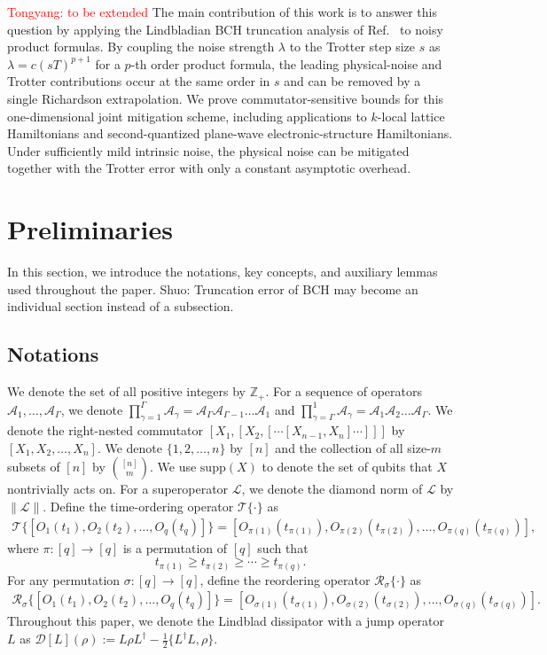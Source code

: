 \documentclass[aps,pra,reprint,groupedaddress,floatfix]{revtex4-2}
\newcommand{\A}{\mathcal{A}}
\newcommand{\supp}{\mathrm{supp}}
\newcommand{\mc}{\mathcal}
\newcommand{\mb}{\mathbb}
\newcommand{\sz}[1]{{\color{blue} Shuo: #1}}
\begin{document}
\textcolor{red}{Tongyang: to be extended}
The main contribution of this work is to answer this question by applying the Lindbladian BCH truncation analysis of Ref.~\cite{wang2026lindbladiansimulationcommutatorbounds} to noisy product formulas. By coupling the noise strength $\lambda$ to the Trotter step size $s$ as $\lambda = c(sT)^{p+1}$ for a $p$-th order product formula, the leading physical-noise and Trotter contributions occur at the same order in $s$ and can be removed by a single Richardson extrapolation. We prove commutator-sensitive bounds for this one-dimensional joint mitigation scheme, including applications to $k$-local lattice Hamiltonians and second-quantized plane-wave electronic-structure Hamiltonians. Under sufficiently mild intrinsic noise, the physical noise can be mitigated together with the Trotter error with only a constant asymptotic overhead.


\section{Preliminaries}
 In this section, we introduce the notations, key concepts, and auxiliary lemmas used throughout the paper. \sz{Truncation error of BCH may become an individual section instead of a subsection.}


\subsection{Notations}
We denote the set of all positive integers by $\mb{Z}_+$. For a sequence of operators $\A_1, \ldots, \A_{\Gamma}$, we denote $\prod_{\gamma=1}^\Gamma \A_{\gamma}= \A_{\Gamma}\A_{\Gamma-1} \ldots \A_1$ and $\prod_{\gamma=\Gamma}^1 \A_{\gamma}= \A_{1}\A_{2} \ldots \A_\Gamma$. We denote the right-nested commutator $[X_1, [X_2, [\cdots[X_{n-1}, X_n]\cdots]]]$ by $[X_1, X_2, \ldots, X_n]$. We denote $\{1, 2, \ldots, n\}$ by $[n]$ and the collection of all size-$m$ subsets of $[n]$ by $\binom{[n]}{m}$. We use $\supp(X)$ to denote the set of qubits that $X$ nontrivially acts on.  For a superoperator $\mc L$, we denote the diamond norm of $\mc L$ by $\|\mc L\|$.
Define the time-ordering operator $\mc T\{\cdot\}$ as \begin{align*}
    \mc T\big\{[O_1(t_1),O_2(t_2),\ldots, O_q(t_q) ]\big\} = [O_{\pi(1)}(t_{\pi(1)}),O_{\pi(2)}(t_{\pi(2)}),\ldots, O_{\pi(q)}(t_{\pi(q)})],
\end{align*}
where $\pi\colon [q]\to[q]$ is a permutation of $[q]$ such that \[
    t_{\pi(1)}\ge t_{\pi(2)}\ge \cdots \ge t_{\pi(q)}.
    \]
For any permutation $\sigma\colon [q]\to [q]$, define the reordering operator $\mc R_{\sigma}\{\cdot\}$ as \begin{align*}
    \mc R_{\sigma}\big\{[O_1(t_1),O_2(t_2),\ldots, O_q(t_q)]\big\} = [O_{\sigma(1)}(t_{\sigma(1)}),O_{\sigma(2)}(t_{\sigma(2)}),\ldots, O_{\sigma(q)}(t_{\sigma(q)})].
\end{align*}
Throughout this paper, we denote the Lindblad dissipator with a jump operator $L$ as $\mathcal{D}[L](\rho):= L\rho L^\dagger - \frac{1}{2}\{L^\dagger L, \rho\}$.
\end{document}
